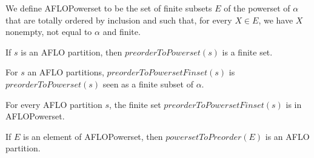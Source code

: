 \begin{subdefi}[AFLOPowerset]
We define AFLOPowerset to be the set of finite subsets $E$ of the powerset of $\alpha$ that are totally ordered by inclusion and such
that, for every $X\in E$, we have $X$ nonempty, not equal to $\alpha$ and finite.

\end{subdefi}

\begin{sublemma}
If $s$ is an AFLO partition, then $preorderToPowerset(s)$ is a finite set.

\end{sublemma}

\begin{subdefi}[preorderToPowersetFinset]
For $s$ an AFLO partitions, $preorderToPowersetFinset(s)$ is $preorderToPowerset(s)$ seen as a finite subset of $\alpha$.

\end{subdefi}

\begin{subdefi}
For every AFLO partition $s$, the finite set $preorderToPowersetFinset(s)$ is in AFLOPowerset.

\end{subdefi}

\begin{sublemma}
If $E$ is an element of AFLOPowerset, then $powersetToPreorder(E)$ is an AFLO partition.

\end{sublemma}